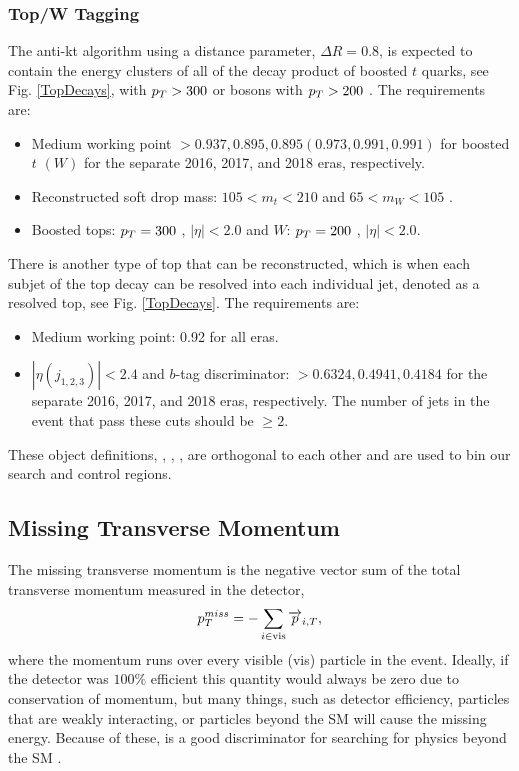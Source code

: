 \subsubsection{Top/W Tagging}\label{TopTagging}
The anti-kt algorithm using a distance parameter, $\Delta R=0.8$, is expected to contain the energy clusters of all of the decay product of boosted $t$ quarks, see Fig. \ref{TopDecays}, with $p_{T}>300$ \GeV{} or \W{} bosons with $p_{T}>200$ \GeV. The requirements are:
\begin{itemize}
	\item Medium working point $>0.937, 0.895, 0.895 (0.973, 0.991, 0.991)$ for boosted $t$ $(W)$ for the separate 2016, 2017, and 2018 eras, respectively.
	\item Reconstructed soft drop\cite{larkoski_soft_2014} mass: $105<m_t<210$ \GeV{} and $65<m_W<105$ \GeV.
	\item Boosted tops: $p_{T}=300$ \GeV, $|\eta|<2.0$ and $W$: $p_{T}=200$ \GeV, $|\eta|<2.0$.
\end{itemize}

There is another type of top that can be reconstructed, which is when each subjet of the top decay can be resolved into each individual jet, denoted as a resolved top, see Fig. \ref{TopDecays}. The requirements are:
\begin{itemize}
	\item Medium working point: 0.92 for all eras.
	\item $|\eta(j_{1,2,3})|<2.4$ and $b$-tag discriminator: $>0.6324, 0.4941, 0.4184$ for the separate 2016, 2017, and 2018 eras, respectively. The number of jets in the event that pass these cuts should be $\geq2$.
\end{itemize}
These object definitions, \nt, \nw, \nrt, are orthogonal to each other and are used to bin our search and control regions. 

\subsection{Missing Transverse Momentum}\label{MET}
The missing transverse momentum is the negative vector sum of the total transverse momentum measured in the detector,
\begin{equation}
p_{T}^{miss}=-\sum_{i\in\text{vis}}\overrightarrow{p}_{i, T},
\end{equation}
where the momentum runs over every visible (vis) particle in the event. Ideally, if the detector was $100\%$ efficient this quantity would always be zero due to conservation of momentum, but many things, such as detector efficiency, particles that are weakly interacting, or particles beyond the SM will cause the missing energy. Because of these, \met{} is a good discriminator for searching for physics beyond the SM \cite{noauthor_https://twiki.cern.ch/twiki/bin/view/cms/missingetrun2corrections_nodate}. 

